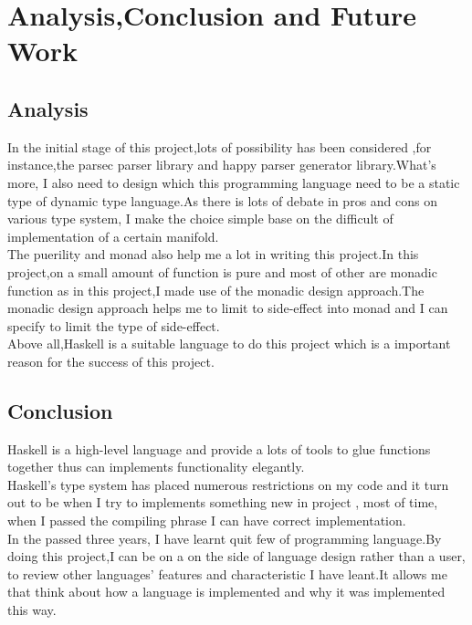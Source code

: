 \chapter{Analysis,Conclusion and Future Work }
\section{Analysis}
In the initial stage of this project,lots of possibility has been considered ,for instance,the parsec parser library and happy parser generator library.What's more, I also need to design which this programming language need to be a static type of dynamic type language.As there is lots of debate in pros and cons on various type system, I make the choice simple base on the difficult of implementation of a certain manifold.\\

The puerility and monad also help me a lot in writing this project.In this project,on a small amount of function is pure and most of other are monadic function as in this project,I made use of the monadic design approach.The monadic design approach helps me to limit to side-effect into monad and I can specify to limit the type of side-effect.
\\

Above all,Haskell is a suitable language to do this project which is a important reason for the success of this project.



\section{Conclusion}
Haskell is a high-level language and provide a lots of tools to glue functions together thus can implements functionality elegantly.\\

Haskell's type system has placed numerous restrictions on my code and it turn out to be when I try to implements something new in project , most of time, when I passed the compiling phrase I can have correct implementation.\\

In the passed three years, I have learnt quit few of programming language.By doing this project,I can be on a on the side of language design rather than a user, to review other languages' features and characteristic I have leant.It allows me that think about how a language is implemented and why it was implemented this way.\\


